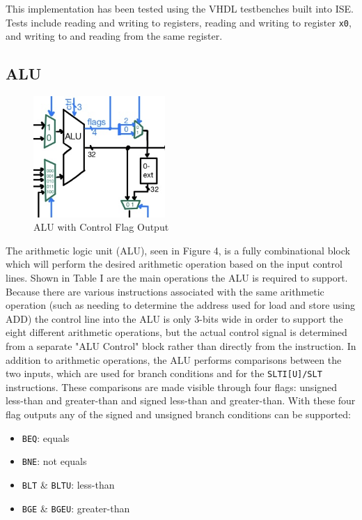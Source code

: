 \documentclass[lettersize,journal]{IEEEtran}
\begin{document}
This implementation has been tested using the VHDL testbenches built into ISE.
Tests include reading and writing to registers, reading and writing to register \verb|x0|, and writing to and reading from the same register.


\subsection{ALU}
\begin{figure}[!h]
    \label{fig:alublock}
    \centering
    \includegraphics[width=5cm]{ALU.jpg}
    \caption{ALU with Control Flag Output}
\end{figure}
The arithmetic logic unit (ALU), seen in Figure 4, is a fully combinational block which will perform the desired arithmetic operation based on the input control lines.
Shown in Table I are the main operations the ALU is required to support. Because there are various instructions associated with the same
arithmetic operation (such as needing to determine the address used for load and store using ADD) the control line into the ALU is only 3-bits wide in order to support
the eight different arithmetic operations, but the actual control signal is determined from a separate "ALU Control" block rather than directly from the instruction.
In addition to arithmetic operations, the ALU performs comparisons between the two inputs, which are used for branch conditions and for the \verb|SLTI[U]/SLT| instructions.
These comparisons are made visible through four flags: unsigned less-than and greater-than and signed less-than and greater-than.
With these four flag outputs any of the signed and unsigned branch conditions can be supported:
\begin{itemize}
    \item \verb|BEQ|: equals
    \item \verb|BNE|: not equals
    \item \verb|BLT| \& \verb|BLTU|: less-than
    \item \verb|BGE| \& \verb|BGEU|: greater-than
\end{itemize}
\end{document}
